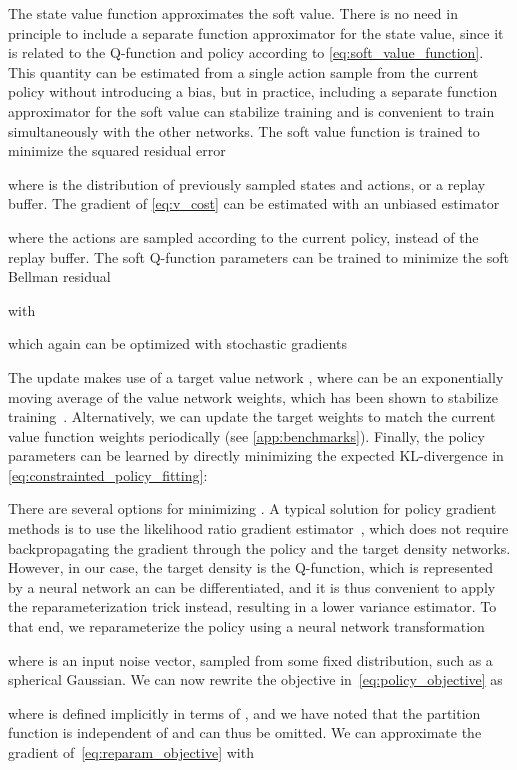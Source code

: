 \documentclass{article}
\begin{document}
The state value function approximates the soft value. There is no need in principle to include a separate function approximator for the state value, since it is related to the Q-function and policy according to \autoref{eq:soft_value_function}. This quantity can be estimated from a single action sample from the current policy without introducing a bias, but in practice, including a separate function approximator for the soft value can stabilize training
and is convenient to train simultaneously with the other networks. The soft value function is trained to minimize the squared residual error 

where  is the distribution of previously sampled states and actions, or a replay buffer. The gradient of \autoref{eq:v_cost} can be estimated with an unbiased estimator

where the actions are sampled according to the current policy, instead of the replay buffer. The soft Q-function parameters can be trained to minimize the soft Bellman residual

with 

which again can be optimized with stochastic gradients

The update  makes use of a target value network , where  can be an exponentially moving average of the value network weights, which has been shown to stabilize training~\citep{mnih2015human}. Alternatively, we can update the target weights to match the current value function weights periodically (see \autoref{app:benchmarks}).  Finally, the policy parameters can be learned by directly minimizing the expected KL-divergence in \autoref{eq:constrainted_policy_fitting}:

There are several options for minimizing . A typical solution for policy gradient methods is to use the likelihood ratio gradient estimator~\citep{williams1992simple}, which does not require backpropagating the gradient through the policy and the target density networks. However, in our case, the target density is the Q-function, which is represented by a neural network an can be differentiated, and it is thus convenient to apply the reparameterization trick instead, resulting in a lower variance estimator. To that end, we reparameterize the policy using a neural network transformation 

where  is an input noise vector, sampled from some fixed distribution, such as a spherical Gaussian. We can now rewrite the objective in~\autoref{eq:policy_objective} as

where  is defined implicitly in terms of , and we have noted that the partition function is independent of  and can thus be omitted. We can approximate the gradient of~\autoref{eq:reparam_objective} with
\end{document}
